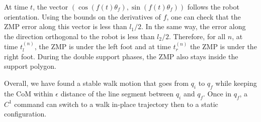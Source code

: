 \documentclass{article}
\begin{document}
At time $t$, the vector 
$\left(
\cos( f(t) \theta_f) ,
\sin( f(t) \theta_f)
\right)$ 
follows the robot orientation.
Using the bounds on the derivatives of $f$, one can check that 
the ZMP error along this vector is less than 
$l_1/2$. In the same way, the error along the direction orthogonal to the robot
is less than $l_2/2$. Therefore, for all $n$, at time $t^{(n)}_l$, the ZMP is under the left
foot and at time $t^{(n)}_r$ the ZMP is under the right foot. During the double support
phases, the ZMP also stays inside the support polygon.

Overall, we have found a stable walk motion that goes from $q_i$ to $q_f$ while
keeping the CoM within $\epsilon$ distance of the line segment between $q_i$ 
and $q_f$. Once in $q_f$, a $C^1$ command can switch 
to a walk in-place trajectory then to a static configuration.



   



\end{document}

